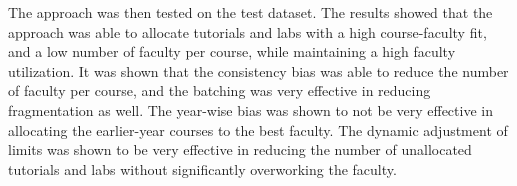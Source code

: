 The approach was then tested on the test dataset. The results showed that the approach was able to allocate tutorials and labs with a high course-faculty fit, and a low number of faculty per course, while maintaining a high faculty utilization. It was shown that the consistency bias was able to reduce the number of faculty per course, and the batching was very effective in reducing fragmentation as well. The year-wise bias was shown to not be very effective in allocating the earlier-year courses to the best faculty. The dynamic adjustment of limits was shown to be very effective in reducing the number of unallocated tutorials and labs without significantly overworking the faculty.
